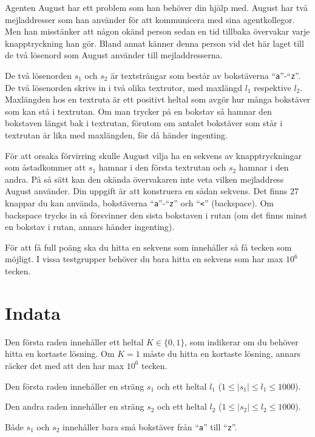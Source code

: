 
Agenten August har ett problem som han behöver din hjälp med. August har två mejladdresser som han använder
för att kommunicera med sina agentkollegor. Men han misstänker att någon okänd person sedan en tid tillbaka 
övervakar varje knapptryckning han gör. Bland annat känner denna person vid det här laget till de två lösenord
 som August använder till mejladdresserna. 
 
De två lösenorden $s_1$ och $s_2$ är textsträngar som består av bokstäverna ``\texttt{a}''-``\texttt{z}''. De två lösenorden skrivs 
in i två olika textrutor, med maxlängd $l_1$ respektive $l_2$. Maxlängden hos en textruta är ett positivt heltal 
som avgör hur många bokstäver som kan stå i textrutan. Om man trycker på en bokstav så hamnar den bokstaven längst 
bak i textrutan, förutom om antalet bokstäver som står i textrutan är lika med maxlängden, för då händer ingenting. 

För att orsaka förvirring skulle August vilja ha en sekvens av knapptryckningar som åstadkommer att $s_1$ hamnar 
i den första textrutan och $s_2$ hamnar i den andra. På så sätt kan den okända övervakaren inte veta vilken 
mejladdress August använder. Din uppgift är att konstruera en sådan sekvens. Det finns $27$ knappar du kan använda, 
bokstäverna ``\texttt{a}''-``\texttt{z}'' och ``\texttt{<}'' (backspace). Om backspace trycks in så försvinner den sista bokstaven i rutan 
(om det finns minst en bokstav i rutan, annars händer ingenting).

För att få full poäng ska du hitta en sekvens som innehåller så få tecken som möjligt. I vissa testgrupper behöver 
du bara hitta en sekvens som har max $10^6$ tecken.


\section*{Indata}
Den första raden innehåller ett heltal $K \in \{0, 1\}$, som indikerar om du behöver hitta en kortaste lösning. 
Om $K = 1$ måste du hitta en kortaste lösning, annars räcker det med att den har max $10^6$ tecken.

Den första raden innehåller en sträng $s_1$ och ett heltal $l_1$ ($1 \leq |s_1| \leq l_1 \leq 1000$).

Den andra raden innehåller en sträng $s_2$ och ett heltal $l_2$ ($1 \leq |s_2| \leq l_2 \leq 1000$).

Både $s_1$ och $s_2$ innehåller bara små bokstäver från ``\texttt{a}'' till ``\texttt{z}''.

